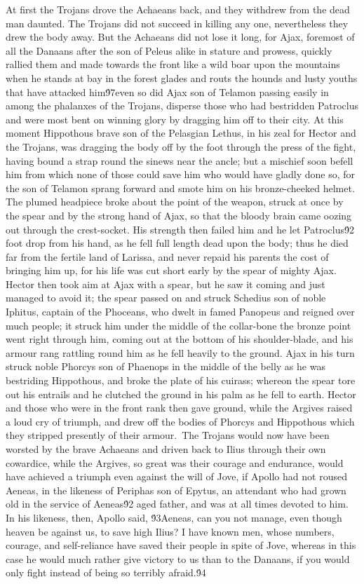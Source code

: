 {At first the Trojans drove the Achaeans back, and they withdrew from the dead man daunted. The Trojans did not succeed in killing any one, nevertheless they drew the body away. But the Achaeans did not lose it long, for Ajax, foremost of all the Danaans after the son of Peleus alike in stature and prowess, quickly rallied them and made towards the front like a wild boar upon the mountains when he stands at bay in the forest glades and routs the hounds and lusty youths that have attacked him\'97even so did Ajax son of Telamon passing easily in among the phalanxes of the Trojans, disperse those who had bestridden Patroclus and were most bent on winning glory by dragging him off to their city. At this moment Hippothous brave son of the Pelasgian Lethus, in his zeal for Hector and the Trojans, was dragging the body off by the foot through the press of the fight, having bound a strap round the sinews near the ancle; but a mischief soon befell him from which none of those could save him who would have gladly done so, for the son of Telamon sprang forward and smote him on his bronze-cheeked helmet. The plumed headpiece broke about the point of the weapon, struck at once by the spear and by the strong hand of Ajax, so that the bloody brain came oozing out through the crest-socket. His strength then failed him and he let Patroclus\'92 foot drop from his hand, as he fell full length dead upon the body; thus he died far from the fertile land of Larissa, and never repaid his parents the cost of bringing him up, for his life was cut short early by the spear of mighty Ajax. Hector then took aim at Ajax with a spear, but he saw it coming and just managed to avoid it; the spear passed on and struck Schedius son of noble Iphitus, captain of the Phoceans, who dwelt in famed Panopeus and reigned over much people; it struck him under the middle of the collar-bone the bronze point went right through him, coming out at the bottom of his shoulder-blade, and his armour rang rattling round him as he fell heavily to the ground. Ajax in his turn struck noble Phorcys son of Phaenops in the middle of the belly as he was bestriding Hippothous, and broke the plate of his cuirass; whereon the spear tore out his entrails and he clutched the ground in his palm as he fell to earth. Hector and those who were in the front rank then gave ground, while the Argives raised a loud cry of triumph, and drew off the bodies of Phorcys and Hippothous which they stripped presently of their armour.\
The Trojans would now have been worsted by the brave Achaeans and driven back to Ilius through their own cowardice, while the Argives, so great was their courage and endurance, would have achieved a triumph even against the will of Jove, if Apollo had not roused Aeneas, in the likeness of Periphas son of Epytus, an attendant who had grown old in the service of Aeneas\'92 aged father, and was at all times devoted to him. In his likeness, then, Apollo said, \'93Aeneas, can you not manage, even though heaven be against us, to save high Ilius? I have known men, whose numbers, courage, and self-reliance have saved their people in spite of Jove, whereas in this case he would much rather give victory to us than to the Danaans, if you would only fight instead of being so terribly afraid.\'94\
}
